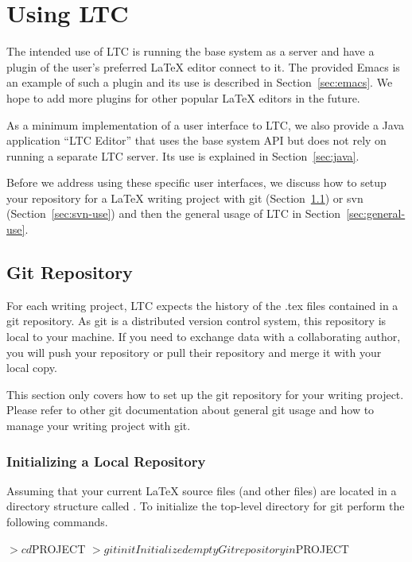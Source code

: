 \chapter{Using LTC}

The intended use of LTC is running the base system as a server and have a plugin of the user's preferred LaTeX editor connect to it.  The provided Emacs  is an example of such a plugin and its use is described in Section~\ref{sec:emacs}.  We hope to add more plugins for other popular LaTeX editors in the future.

As a minimum implementation of a user interface to LTC, we also provide a Java application ``LTC Editor'' that uses the base system API but does not rely on running a separate LTC server.  Its use is explained in Section~\ref{sec:java}.

Before we address using these specific user interfaces, we discuss how to setup your repository for a LaTeX writing project with git (Section~\ref{sec:git-use}) or svn (Section~\ref{sec:svn-use}) and then the general usage of LTC in Section~\ref{sec:general-use}.

\section{Git Repository} \label{sec:git-use}

For each writing project, LTC expects the history of the .tex files contained in a git repository.  As git is a distributed version control system, this repository is local to your machine.  If you need to exchange data with a collaborating author, you will push your repository or pull their repository and merge it with your local copy.

This section only covers how to set up the git repository for your writing project.  Please refer to other git documentation about general git usage and how to manage your writing project with git.

\subsection{Initializing a Local Repository}

Assuming that your current LaTeX source files (and other files) are located in a directory structure called .  To initialize the top-level directory for git perform the following commands.
\begin{CodeVerbatim}
$> cd $PROJECT
$> git init 
Initialized empty Git repository in $PROJECT
\end{CodeVerbatim}


